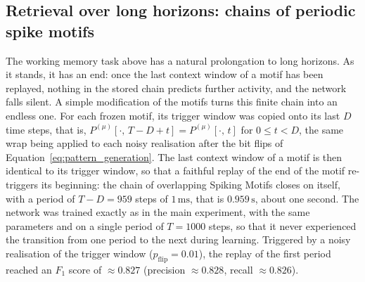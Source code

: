 \documentclass{scrartcl}
\begin{document}
\subsection{Retrieval over long horizons: chains of periodic spike motifs}
\label{sec:periodic}
%

%
The working memory task above has a natural prolongation to long horizons. As it stands, it has an end: once the last context window of a motif has been replayed, nothing in the stored chain predicts further activity, and the network falls silent. A simple modification of the motifs turns this finite chain into an endless one. For each frozen motif, its trigger window was copied onto its last $D$ time steps, that is, $P^{(\mu)}[\cdot,\, T-D+t] = P^{(\mu)}[\cdot,\, t]$ for $0 \le t < D$, the same wrap being applied to each noisy realisation after the bit flips of Equation~\ref{eq:pattern_generation}. The last context window of a motif is then identical to its trigger window, so that a faithful replay of the end of the motif re-triggers its beginning: the chain of overlapping Spiking Motifs closes on itself, with a period of $T - D = 959$ steps of $1\,\mathrm{ms}$, that is $0.959\,\mathrm{s}$, about one second. The network was trained exactly as in the main experiment, with the same parameters and on a single period of $T = 1000$ steps, so that it never experienced the transition from one period to the next during learning. Triggered by a noisy realisation of the trigger window ($p_\mathrm{flip} = 0.01$), the replay of the first period reached an $F_1$ score of $\approx 0.827$ (precision $\approx 0.828$, recall $\approx 0.826$).
\end{document}
